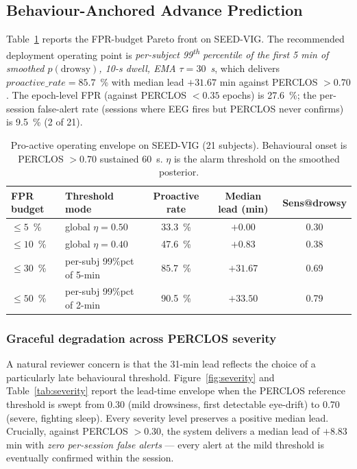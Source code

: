 \documentclass[journal]{IEEEtran}
\DeclareRobustCommand{\add}[1]{#1}                         %
\DeclareRobustCommand{\del}[1]{}                           %
\DeclareRobustCommand{\add}[1]{\hl{#1}}
\DeclareRobustCommand{\del}[1]{{\color{delred}\sout{#1}}\,}
\DeclareRobustCommand{\del}[1]{}                         %
\DeclareRobustCommand{\chg}[2]{\del{#1}\add{#2}}
\begin{document}
\subsection{\chg{Pro-Active Track}{Behaviour-Anchored Advance Prediction}}
\label{sec:proactive}
Table~\ref{tab:proactive} reports the FPR-budget Pareto front on SEED-VIG. The recommended deployment operating point is \emph{per-subject 99\textsuperscript{th} percentile of the first 5 min of smoothed \(p(\mathrm{drowsy})\), 10-s dwell, EMA \(\tau = 30\)~s}, which delivers \(\mathit{proactive\_rate} = 85.7\)~\% with median lead \(+31.67\) min against PERCLOS \(>0.70\). The epoch-level FPR (against PERCLOS \(<0.35\) epochs) is 27.6~\%; the per-session false-alert rate (sessions where EEG fires but PERCLOS never confirms) is 9.5~\% (2 of 21).

\begin{table}[t]
\caption{Pro-active operating envelope on SEED-VIG (21 subjects). Behavioural onset is PERCLOS \(>0.70\) sustained 60~s. \(\eta\) is the alarm threshold on the smoothed posterior.}
\label{tab:proactive}
\centering
\footnotesize
\setlength{\tabcolsep}{3pt}
\begin{tabular}{l l c c c}
\toprule
FPR budget & Threshold mode & Proactive rate & Median lead (min) & Sens@drowsy \\
\midrule
\(\leq 5\)~\%  & global \(\eta=0.50\)                & 33.3~\% & \(+0.00\)  & 0.30 \\
\(\leq 10\)~\% & global \(\eta=0.40\)                & 47.6~\% & \(+0.83\)  & 0.38 \\
\(\leq 30\)~\% & per-subj 99\(\%\)pct of 5-min       & \(\mathbf{85.7}\)~\% & \(\mathbf{+31.67}\) & 0.69 \\
\(\leq 50\)~\% & per-subj 99\(\%\)pct of 2-min       & 90.5~\% & \(+33.50\) & 0.79 \\
\bottomrule
\end{tabular}
\end{table}

\subsubsection{Graceful degradation across PERCLOS severity}
\label{sec:severity}
A natural reviewer concern is that the 31-min lead reflects the choice of a particularly late behavioural threshold. Figure~\ref{fig:severity} and Table~\ref{tab:severity} report the lead-time envelope when the PERCLOS reference threshold is swept from 0.30 (mild drowsiness, first detectable eye-drift) to 0.70 (severe, fighting sleep). Every severity level preserves a positive median lead. Crucially, against PERCLOS \(>0.30\), the system delivers a median lead of \(+8.83\) min with \emph{zero per-session false alerts} --- every alert at the mild threshold is eventually confirmed within the session.
\end{document}

